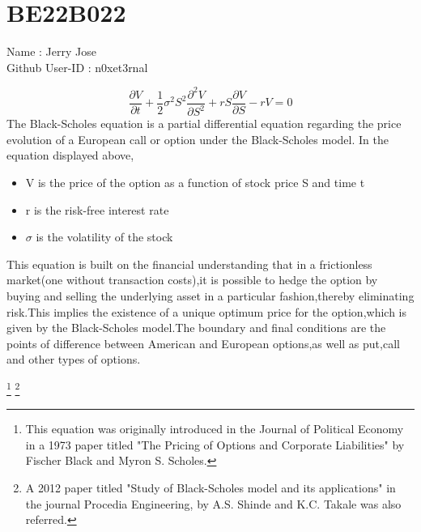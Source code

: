 



\section{BE22B022}

Name : Jerry Jose\\
Github User-ID : n0xet3rnal

\begin{equation}
{\frac {\partial V}{\partial t}}+{\frac {1}{2}}\sigma ^{2}S^{2}{\frac {\partial ^{2}V}{\partial S^{2}}}+rS{\frac {\partial V}{\partial S}}-rV=0
\label{bs_pde}
\end{equation}
The Black-Scholes equation is a partial differential equation regarding the price evolution of a European call or option under the Black-Scholes model.
In the equation displayed above,
\begin{itemize}
\item V is the price of the option as a function of stock price S and time t
\item r is the risk-free interest rate
\item $\sigma$ is the volatility of the stock
\end{itemize}
This equation is built on the financial understanding that in a frictionless market(one without transaction costs),it is possible to hedge the option by buying and selling the underlying asset in a particular fashion,thereby eliminating risk.This implies the existence of a unique optimum price for the option,which is given by the Black-Scholes model.The boundary and final conditions are the points of difference between American and European options,as well as put,call
and other types of options.


\footnote{This equation was originally introduced in the Journal of Political Economy in a 1973 paper titled "The Pricing of Options and Corporate Liabilities" by Fischer Black and Myron S. Scholes.}
\footnote{A 2012 paper titled "Study of Black-Scholes model and its applications" in the journal Procedia Engineering, by A.S. Shinde and K.C. Takale was also referred.}


